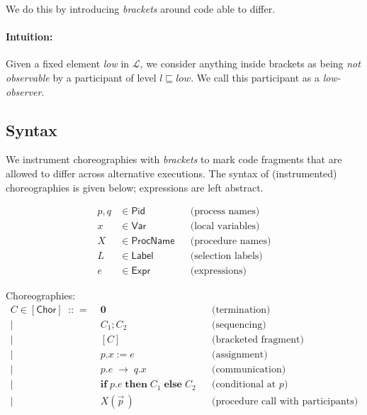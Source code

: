 \documentclass[12pt,a4paper,twoside]{book}
\newcommand{\metaDeff}{\mathrel{\mathop{::}}=}
\newcommand{\MCL}{\mathscr{L}}
\begin{document}
We do this by introducing \emph{brackets} around code able to differ.

\paragraph{Intuition:} Given a fixed element \textit{low} in $\MCL$, we consider anything inside brackets as being \emph{not observable} by a participant of level $l \sqsubseteq \textit{low}$. We call this participant as a \emph{low-observer}.

\subsection{Syntax}
We instrument choreographies with \emph{brackets} to mark code fragments that are allowed to differ across alternative executions. The syntax of (instrumented) choreographies is given below; expressions are left abstract.

\begin{align*}
p,q &\in \mathsf{Pid}            && \text{(process names)}\\
x   &\in \mathsf{Var}          && \text{(local variables)}\\
X   &\in \mathsf{ProcName}       && \text{(procedure names)}\\
L   &\in \mathsf{Label}          && \text{(selection labels)}\\
e   &\in \mathsf{Expr}           && \text{(expressions)}
\end{align*}

\noindent Choreographies:
\[
\begin{array}{rcll}
C \in \mathsf{[Chor]} \;\metaDeff\;
  & \boldsymbol{0}                          & & \text{(termination)}\\
\mid& C_1 \mathbin{;} C_2                   & & \text{(sequencing)}\\
	\mid& [C] & & \text{(bracketed fragment)}\\
\mid& p.x \mathrel{:=} e                    & & \text{(assignment)}\\
\mid& p.e \;\rightarrow\; q.x               & & \text{(communication)}\\
\mid& \mathbf{if}\; p.e\; \mathbf{then}\; C_1\; \mathbf{else}\; C_2
                                           & & \text{(conditional at }p\text{)}\\
	\mid& X(\vec{p}\,)        & & \text{(procedure call with participants)}
\end{array}
\]
\end{document}
